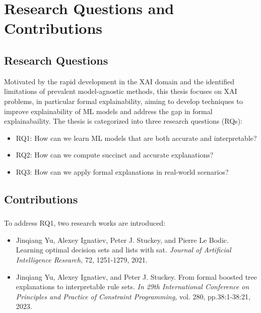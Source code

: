 \section{Research Questions and Contributions}\label{sec:rq}

\subsection{Research Questions}
Motivated by the rapid development in the XAI domain
and the identified limitations of prevalent model-agnostic methods,
this thesis focuses on XAI problems, in particular formal explainability, 
aiming to develop techniques to improve explainability of ML models 
and address the gap in formal explainabaility.
%
The thesis is categorized into three research questions (RQs):
\begin{itemize}
	\item RQ1: How can we learn ML models that are both accurate and interpretable?
	\item RQ2: How can we compute succinct and accurate explanations?
	\item RQ3: How can we apply formal explanations in real-world scenarios? 
\end{itemize}

\subsection{Contributions}

\subsubsection{}

To address RQ1, two research works are introduced:

\begin{itemize}
	\item Jinqiang Yu, Alexey Ignatiev, Peter J. Stuckey, and Pierre Le Bodic. Learning optimal decision
sets and lists with sat. \emph{Journal of Artificial Intelligence Research,} 72, 1251-1279, 2021.

	\item Jinqiang Yu, Alexey Ignatiev, and Peter J. Stuckey. From formal boosted tree explanations to
interpretable rule sets. \emph{In 29th International Conference on Principles and Practice of
	Constraint Programming,} vol. 280, pp.38:1-38:21, 2023.
\end{itemize}

